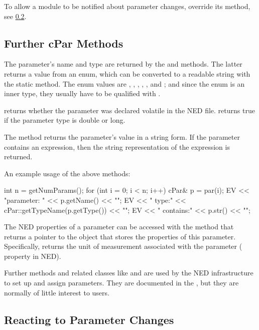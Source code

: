 To allow a module to be notified about parameter changes, override
its  method, see
\ref{sec:simple-modules:handleparameterchange}.


\subsection{Further cPar Methods}
\label{sec:simple-modules:further-cpar-methods}

The parameter's name and type are returned by the  and
 methods. The latter returns a value from an enum,
which can be converted to a readable string with the 
static method. The enum values are , , ,
, , and ; and since the enum is an inner type,
they usually have to be qualified with .

 returns whether the parameter was declared volatile
in the NED file.  returns true if the parameter
type is double or long.

The  method returns the parameter's value in a string form.
If the parameter contains an expression, then the string representation
of the expression is returned.

An example usage of the above methods:

\begin{cpp}
int n = getNumParams();
for (int i = 0; i < n; i++)
{
    cPar& p = par(i);
    EV << "parameter: " << p.getName() << "\n";
    EV << "  type:" << cPar::getTypeName(p.getType()) << "\n";
    EV << "  contains:" << p.str() << "\n";
}
\end{cpp}

The NED properties of a parameter can be accessed with the 
method that returns a pointer to the  object that stores
the properties of this parameter. Specifically,  returns
the unit of measurement associated with the parameter ( property in NED).

Further  methods and related classes like  and
 are used by the NED infrastructure to set up and
assign parameters. They are documented in the , but
they are normally of little interest to users.


\subsection{Reacting to Parameter Changes}
\label{sec:simple-modules:handleparameterchange}

